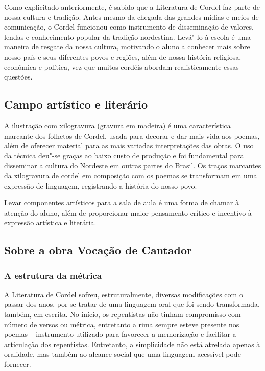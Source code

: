 \documentclass{article}
\begin{document}
Como explicitado anteriormente, é sabido que a Literatura de Cordel faz
parte de nossa cultura e tradição. Antes mesmo da chegada das grandes
mídias e meios de comunicação, o Cordel funcionou como instrumento de
disseminação de valores, lendas e conhecimento popular da tradição
nordestina. Levá"-lo à escola é uma maneira de resgate da nossa cultura,
motivando o aluno a conhecer mais sobre nosso país e seus diferentes
povos e regiões, além de nossa história religiosa, econômica e política,
vez que muitos cordéis abordam realisticamente essas questões.

\subsection{Campo artístico e literário }

A ilustração com xilogravura (gravura em madeira) é uma característica
marcante dos folhetos de Cordel, usada para decorar e dar mais vida aos
poemas, além de oferecer material para as mais variadas interpretações
das obras. O uso da técnica deu"-se graças ao baixo custo de produção e
foi fundamental para disseminar a cultura do Nordeste em outras partes
do Brasil. Os traços marcantes da xilogravura de cordel em composição
com os poemas se transformam em uma expressão de linguagem, registrando
a história do nosso povo.

Levar componentes artísticos para a sala de aula é uma forma de chamar à
atenção do aluno, além de proporcionar maior pensamento crítico e
incentivo à expressão artística e literária.

\subsection{Sobre a obra Vocação de Cantador}

\subsubsection{A estrutura da métrica}

A Literatura de Cordel sofreu, estruturalmente, diversas modificações
com o passar dos anos, por se tratar de uma linguagem oral que foi sendo
transformada, também, em escrita. No início, os repentistas não tinham
compromisso com número de versos ou métrica, entretanto a rima sempre
esteve presente nos poemas -- instrumento utilizado para favorecer a
memorização e facilitar a articulação dos repentistas. Entretanto, a
simplicidade não está atrelada apenas à oralidade, mas também ao alcance
social que uma linguagem acessível pode fornecer.
\end{document}
